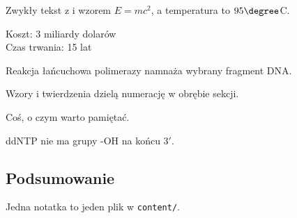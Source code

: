 
Zwykły tekst z  i wzorem $E = mc^2$, a temperatura to $95\degree$C.

\begin{fakty}
Koszt: 3 miliardy dolarów\\
Czas trwania: 15 lat
\end{fakty}

\begin{definicja}[PCR]
Reakcja łańcuchowa polimerazy namnaża wybrany fragment DNA.
\end{definicja}

\begin{twierdzenie}[Przykład]
Wzory i twierdzenia dzielą numerację w obrębie sekcji.
\end{twierdzenie}

\begin{uwaga}
Coś, o czym warto pamiętać.
\end{uwaga}

\begin{wazne}[Na kolokwium]
ddNTP nie ma grupy \mbox{-OH} na końcu 3$'$.
\end{wazne}

\subsection{Podsumowanie}
\begin{podsumowanie}
Jedna notatka to jeden plik w \texttt{content/}.
\end{podsumowanie}
